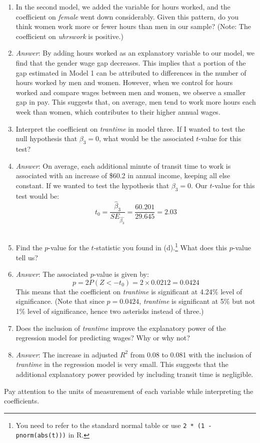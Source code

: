 \documentclass{./../../Latex/handout}
\begin{document}
\begin{enumerate}
\begin{enumerate}
  \item In the second model, we added the variable for hours worked, and the coefficient on \textit{female} went down considerably. Given this pattern, do you think women work more or fewer hours than men in our sample? (Note: The coefficient on \textit{uhrswork} is positive.)
  \item[] \textit{Answer}: By adding hours worked as an explanatory variable to our model, we find that the gender wage gap decreases. This implies that a portion of the gap estimated in Model 1 can be attributed to differences in the number of hours worked by men and women. However, when we control for hours worked and compare wages between men and women, we observe a smaller gap in pay. This suggests that, on average, men tend to work more hours each week than women, which contributes to their higher annual wages. \\
  
  \item Interpret the coefficient on \textit{trantime} in model three. If I wanted to test the null hypothesis that $\beta_3=0$, what would be the associated $t$-value for this test?
  \item[] \textit{Answer}: On average, each additional minute of transit time to work is associated with an increase of \$60.2 in annual income, keeping all else constant. If we wanted to test the hypothesis that $\beta_3=0$. Our $t$-value for this test would be:
  $$ t_0 = \frac{\hat{\beta}_3}{SE_{\hat{\beta_3}}} = \frac{60.201}{29.645} = 2.03 $$	\\
  
  \item Find the $p$-value for the $t$-statistic you found in (d).\footnote{You need to refer to the standard normal table or use \texttt{2 * (1 - pnorm(abs(t)))} in R.} What does this $p$-value tell us?
  \item[] \textit{Answer}: The associated $p$-value is given by:
  $$ p = 2 P(Z < -t_0) =  2 \times 0.0212 = 0.0424$$
  This means that the coefficient on \textit{trantime} is significant at 4.24\% level of significance. (Note that since $p=0.0424$, \textit{trantime} is significant at 5\% but not 1\% level of significance, hence two asterisks instead of three.)	\\
  
  \item Does the inclusion of \textit{trantime} improve the explanatory power of the regression model for predicting wages? Why or why not?
  \item[] \textit{Answer}: The increase in adjusted $R^2$ from 0.08 to 0.081 with the inclusion of \textit{trantime} in the regression model is very small. This suggests that the additional explanatory power provided by including transit time is negligible.	\\
\end{enumerate}
Pay attention to the units of measurement of each variable while interpreting the coefficients. \\


\end{enumerate}
\end{document}
